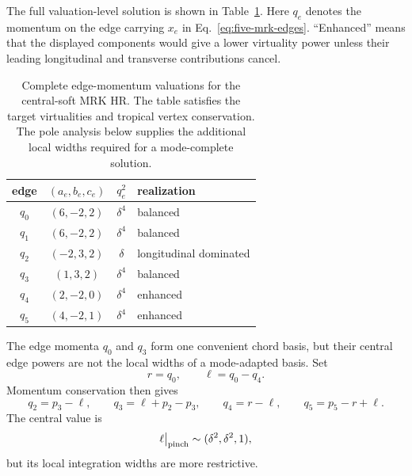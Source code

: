 \documentclass[a4paper,11pt]{article}
\begin{document}
The full valuation-level solution is shown in
Table~\ref{tab:five-mrk-edge-flow}.  Here \(q_e\) denotes the momentum on the
edge carrying \(x_e\) in Eq.~\eqref{eq:five-mrk-edges}.  ``Enhanced'' means
that the displayed components would give a lower virtuality power unless
their leading longitudinal and transverse contributions cancel.
\begin{table}[H]
\centering
\small
\begin{tabular}{@{}c c c l@{}}
\toprule
edge & \((a_e,b_e,c_e)\) & \(q_e^2\) & realization\\
\midrule
\(q_0\) & \((6,-2,2)\) & \(\delta^4\) & balanced\\
\(q_1\) & \((6,-2,2)\) & \(\delta^4\) & balanced\\
\(q_2\) & \((-2,3,2)\) & \(\delta\) & longitudinal dominated\\
\(q_3\) & \((1,3,2)\) & \(\delta^4\) & balanced\\
\(q_4\) & \((2,-2,0)\) & \(\delta^4\) & enhanced\\
\(q_5\) & \((4,-2,1)\) & \(\delta^4\) & enhanced\\
\bottomrule
\end{tabular}
\caption{Complete edge-momentum valuations for the central-soft MRK HR.
The table satisfies the target virtualities and tropical vertex conservation.
The pole analysis below supplies the additional local widths required for a
mode-complete solution.}
\label{tab:five-mrk-edge-flow}
\end{table}

The edge momenta \(q_0\) and \(q_3\) form one convenient chord basis, but
their central edge powers are not the local widths of a mode-adapted basis.
Set
\begin{equation}
 r=q_0,\qquad \ell=q_0-q_4.
 \label{eq:five-mrk-glauber-rerouting}
\end{equation}
Momentum conservation then gives
\begin{equation}
 q_2=p_3-\ell,\qquad q_3=\ell+p_2-p_3,
 \qquad q_4=r-\ell,\qquad q_5=p_5-r+\ell.
 \label{eq:five-mrk-mode-routing}
\end{equation}
The central value is
\begin{equation}
 \ell\big|_{\rm pinch}\sim(\delta^2,\delta^2,1),
 \label{eq:five-mrk-glauber-value}
\end{equation}
but its local integration widths are more restrictive.
\end{document}
